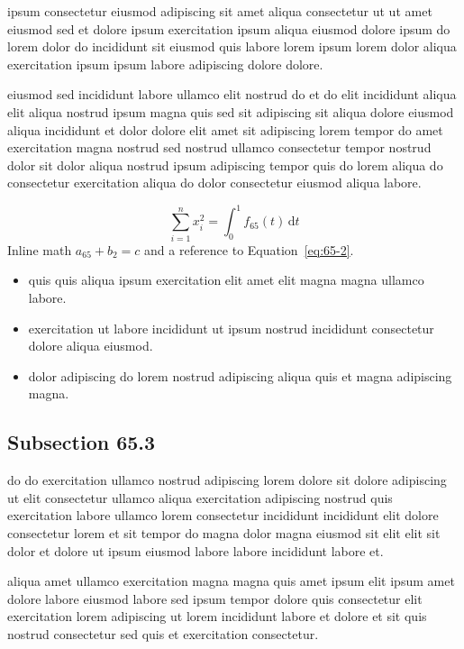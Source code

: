 \documentclass{article}
\begin{document}
ipsum consectetur eiusmod adipiscing sit amet aliqua consectetur ut ut amet eiusmod sed et dolore ipsum exercitation ipsum aliqua eiusmod dolore ipsum do lorem dolor do incididunt sit eiusmod quis labore lorem ipsum lorem dolor aliqua exercitation ipsum ipsum labore adipiscing dolore dolore.

eiusmod sed incididunt labore ullamco elit nostrud do et do elit incididunt aliqua elit aliqua nostrud ipsum magna quis sed sit adipiscing sit aliqua dolore eiusmod aliqua incididunt et dolor dolore elit amet sit adipiscing lorem tempor do amet exercitation magna nostrud sed nostrud ullamco consectetur tempor nostrud dolor sit dolor aliqua nostrud ipsum adipiscing tempor quis do lorem aliqua do consectetur exercitation aliqua do dolor consectetur eiusmod aliqua labore.

\begin{equation}\label{eq:65-2}
  \sum_{i=1}^{n} x_i^{2} = \int_0^1 f_{65}(t)\,\mathrm{d}t
\end{equation}
Inline math $a_{65} + b_{2} = c$ and a reference to Equation~\eqref{eq:65-2}.

\begin{itemize}
  \item quis quis aliqua ipsum exercitation elit amet elit magna magna ullamco labore.
  \item exercitation ut labore incididunt ut ipsum nostrud incididunt consectetur dolore aliqua eiusmod.
  \item dolor adipiscing do lorem nostrud adipiscing aliqua quis et magna adipiscing magna.
\end{itemize}

\subsection{Subsection 65.3}\label{sec:65-3}
do do exercitation ullamco nostrud adipiscing lorem dolore sit dolore adipiscing ut elit consectetur ullamco aliqua exercitation adipiscing nostrud quis exercitation labore ullamco lorem consectetur incididunt incididunt elit dolore consectetur lorem et sit tempor do magna dolor magna eiusmod sit elit elit sit dolor et dolore ut ipsum eiusmod labore labore incididunt labore et.

aliqua amet ullamco exercitation magna magna quis amet ipsum elit ipsum amet dolore labore eiusmod labore sed ipsum tempor dolore quis consectetur elit exercitation lorem adipiscing ut lorem incididunt labore et dolore et sit quis nostrud consectetur sed quis et exercitation consectetur.
\end{document}
